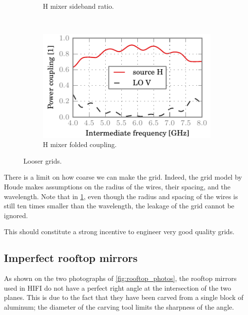 \begin{figure}[hbtp]
\begin{subfigure}[b]{.5\textwidth}
        \caption{H mixer sideband ratio.}
    \end{subfigure}%
    \\
    \begin{subfigure}[b]{.5\textwidth}
        \includegraphics{chapter_3/07_looser_h_ssb}%
        \caption{H mixer folded coupling.}
    \end{subfigure}%
    \caption{Looser grids.}
    \label{fig:07_looser}
\end{figure}

There is a limit on how coarse we can make the grid.
Indeed, the grid model by Houde makes assumptions on the radius of the wires, their spacing, and the wavelength.
Note that in \cref{fig:07_looser}, even though the radius and spacing of the wires is still ten times smaller than the wavelength, the leakage of the grid cannot be ignored.

This should constitute a strong incentive to engineer very good quality grids.

\clearpage
\subsection{Imperfect rooftop mirrors}
As shown on the two photographs of \cref{fig:rooftop_photos}, the rooftop mirrors used in HIFI do not have a perfect right angle at the intersection of the two planes.
This is due to the fact that they have been carved from a single block of aluminum; the diameter of the carving tool limits the sharpness of the angle.

